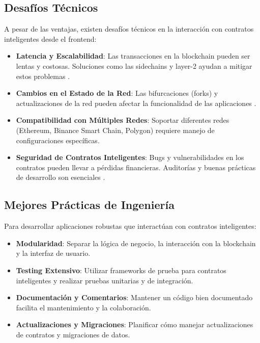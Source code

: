 \subsection{Desafíos Técnicos}

A pesar de las ventajas, existen desafíos técnicos en la interacción con contratos inteligentes desde el frontend:

\begin{itemize}
    \item \textbf{Latencia y Escalabilidad}: Las transacciones en la blockchain pueden ser lentas y costosas. Soluciones como las sidechains y layer-2 ayudan a mitigar estos problemas \cite{croman2016scaling}.

    \item \textbf{Cambios en el Estado de la Red}: Las bifurcaciones (forks) y actualizaciones de la red pueden afectar la funcionalidad de las aplicaciones \cite{gudgeon2020defi}.

    \item \textbf{Compatibilidad con Múltiples Redes}: Soportar diferentes redes (Ethereum, Binance Smart Chain, Polygon) requiere manejo de configuraciones específicas.

    \item \textbf{Seguridad de Contratos Inteligentes}: Bugs y vulnerabilidades en los contratos pueden llevar a pérdidas financieras. Auditorías y buenas prácticas de desarrollo son esenciales \cite{atzei2017survey}.

\end{itemize}

\subsection{Mejores Prácticas de Ingeniería}

Para desarrollar aplicaciones robustas que interactúan con contratos inteligentes:

\begin{itemize}
    \item \textbf{Modularidad}: Separar la lógica de negocio, la interacción con la blockchain y la interfaz de usuario.

    \item \textbf{Testing Extensivo}: Utilizar frameworks de prueba para contratos inteligentes y realizar pruebas unitarias y de integración.

    \item \textbf{Documentación y Comentarios}: Mantener un código bien documentado facilita el mantenimiento y la colaboración.

    \item \textbf{Actualizaciones y Migraciones}: Planificar cómo manejar actualizaciones de contratos y migraciones de datos.

\end{itemize}

